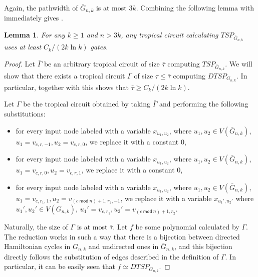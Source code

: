 \documentclass[11pt,a4paper]{article}
\newtheorem{lemma}{Lemma}[section]
\renewcommand{\mod}{\ \mathsf{mod}\ }
\begin{document}
Again, the pathwidth of $\bar{G}_{n, k}$ is at most $3k$.
Combining the following lemma with  immediately gives .

\begin{lemma}\label{lem:tc_tsp}
    For any $k \geq 1$ and $n > 3k$, any tropical circuit calculating $TSP_{\bar{G}_{n, k}}$ uses at least
    $C_k / (2k \ln k)$
    gates.
\end{lemma}

\begin{proof}
    Let $\bar\Gamma$ be an arbitrary tropical circuit of size $\bar\tau$ computing $TSP_{\bar{G}_{n, k}}$. We will show that there exists a tropical circuit $\Gamma$ of size $\tau \leq \bar\tau$ computing $DTSP_{G_{n, k}}$. In particular, together with  this shows that $\bar\tau \geq C_k/(2k \ln k)$.

    Let $\Gamma$ be the tropical circuit obtained by taking $\bar\Gamma$ and performing the following substitutions:
    \begin{itemize}
        \item for every input node labeled with a variable $x_{u_1, u_2}$, where $u_1, u_2 \in V(\bar{G}_{n, k})$, $u_1 = v_{c, r, -1}, u_2 = v_{c, r, 0}$, we replace it with a constant $0$,
        \item for every input node labeled with a variable $x_{u_1, u_2}$, where $u_1, u_2 \in V(\bar{G}_{n, k})$, $u_1 = v_{c, r, 0}, u_2 = v_{c, r, 1}$, we replace it with a constant $0$,
        \item for every input node labeled with a variable $x_{u_1, u_2}$, where $u_1, u_2 \in V(\bar{G}_{n, k})$, $u_1 = v_{c, r_1, 1}, u_2 = v_{(c \mod n) + 1, r_2, -1}$, we replace it with a variable $x_{u_1', u_2'}$ where $u_1', u_2' \in V(G_{n, k})$, $u_1' = v_{c, r_1}, u_2' = v_{(c \mod n) + 1, r_2}$.
    \end{itemize}
    Naturally, the size of $\Gamma$ is at most $\bar\tau$. Let $f$ be some polynomial calculated by $\Gamma$. The reduction works in such a way that there is a bijection between directed Hamiltonian cycles in $G_{n, k}$ and undirected ones in $\bar{G}_{n, k}$, and this bijection directly follows the substitution of edges described in the definition of $\Gamma$. In particular, it can be easily seen that $f \simeq DTSP_{G_{n,k}}$.

\end{proof}
\end{document}
